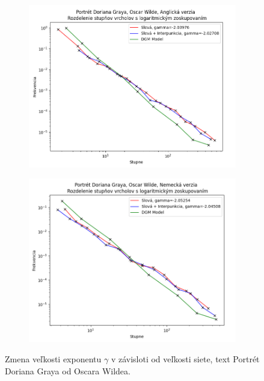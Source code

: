 \begin{figure}[htbp]
    \centering
    \begin{subfigure}[b]{0.9\textwidth}
        \includegraphics[width=\textwidth]{images/lbdegdist/Screenshot_3.png}
    \end{subfigure}

    \vspace{0.3cm}

    \begin{subfigure}[b]{0.9\textwidth}
        \includegraphics[width=\textwidth]{images/lbdegdist/Screenshot_4.png}
    \end{subfigure}
    
    \vspace{0.3cm}
    \caption{Zmena veľkosti exponentu $\gamma$ v závisloti od veľkosti siete, text Portrét Doriana Graya od Oscara Wildea.}
\end{figure}

